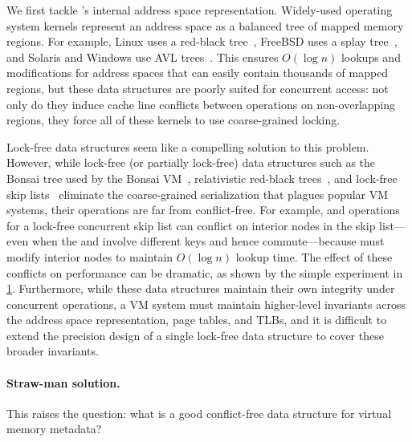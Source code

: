 We first tackle \vm's internal address space representation.
%
Widely-used operating system kernels represent an address space as a
balanced tree of mapped memory regions.  For example, Linux uses a
red-black tree~\cite{linux-source}, FreeBSD uses a splay
tree~\cite{freebsd-source}, and Solaris and Windows use AVL
trees~\cite{windows:wrk,windows:slides}.  This ensures $O(\log n)$ lookups
and modifications for address spaces that can easily contain thousands
of mapped regions, but these data structures are poorly suited for
concurrent access: not only do they induce cache line conflicts
between operations on non-overlapping regions, they force all of these
kernels to use coarse-grained locking.

Lock-free data structures seem like a compelling solution to this
problem.  However, while lock-free (or partially lock-free) data
structures such as the Bonsai tree used by the Bonsai
VM~\cite{clements:bonsai}, relativistic red-black
trees~\cite{howard:relrbtree}, and lock-free skip
lists~\cite{herlihy:art} eliminate the coarse-grained serialization
that plagues popular VM systems, their operations are far from
conflict-free.  For example,  and 
operations for a lock-free concurrent skip list can conflict on
interior nodes in the skip list---even when the  and
 involve different keys and hence commute---because
 must modify interior nodes to maintain $O(\log n)$
lookup time.
%
The effect of these conflicts on performance can be dramatic, as shown
by the simple experiment in \cref{fig:skiplist}.
Furthermore, while these data structures maintain their own integrity
under concurrent operations, a VM system must maintain higher-level
invariants across the address space representation, page tables, and
TLBs, and it is difficult to extend the precision design of a single
lock-free data structure to cover these broader invariants.

\begin{figure}
  \centering
  
  \label{fig:skiplist}
\end{figure}

\paragraph{Straw-man solution.}
This raises the question: what is a good conflict-free data structure
for virtual memory metadata?

